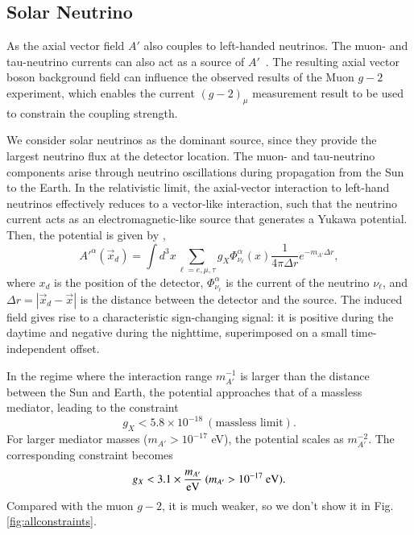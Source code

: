 \documentclass[onecolumn, aps, nofootinbib, prd, preprint, floats, floatfix, amsmath, amssymb, superscriptaddress, preprintnumbers]{revtex4-1}
\begin{document}
\subsection{Solar Neutrino}
As the axial vector field $A'$ also couples to left-handed neutrinos. The muon- and tau-neutrino currents can also act as a source of $A'$~\cite{Fang:2025fvo}. The resulting axial vector boson background field can influence the observed results of the Muon $g-2$ experiment, which enables the current $(g-2)_\mu$ measurement result to be used to constrain the coupling strength. 

We consider solar neutrinos as the dominant source, since they provide the largest neutrino flux at the detector location. The muon- and tau-neutrino components arise through neutrino oscillations during propagation from the Sun to the Earth.
In the relativistic limit, the axial-vector interaction to left-hand neutrinos effectively reduces to a vector-like interaction, such that the neutrino current acts as an electromagnetic-like source that generates a Yukawa potential.
Then, the potential is given by \cite{Fang:2025fvo},
\begin{equation}
A'^{\alpha} (\vec{x}_d)= \int d^3 x \sum_{\ell = e, \mu, \tau} g_X { \Phi_{\nu_\ell}^{\alpha}(x) }\frac{1}{4 \pi \Delta r}  e^{-m_{A'} \Delta r},
\label{eq:axial-vector-potential}
\end{equation}
where $x_d$ is the position of the detector, $\Phi_{\nu_\ell}^{\alpha}$ is the current of the neutrino $\nu_\ell$, and $\Delta r = |\vec{x}_d - \vec{x}|$ is the distance between the detector and the source. The induced field gives rise to a characteristic sign-changing signal: it is positive during the daytime and negative during the nighttime, superimposed on a small time-independent offset.

In the regime where the interaction range $m^{-1}_{A'}$ is larger than the distance between the Sun and Earth, the potential approaches that of a massless mediator, leading to the constraint~\cite{Fang:2025fvo}
\begin{equation}
g_X < 5.8 \times 10^{-18}\  (\text{massless limit}). 
\end{equation}
For larger mediator masses ($m_{A'} > 10^{-17}$ eV), the potential scales as $m^{-2}_{A'}$. The corresponding constraint becomes~\cite{Fang:2025fvo}
\begin{equation}
g_X < 3.1 \times   \frac{ m_{A'}}{{\rm eV}}\ (m_{A'} > 10^{-17}\ \rm{eV}). 
\end{equation}
Compared with the muon $g-2$, it is much weaker, so we don't show it in Fig. \ref{fig:allconstraints}.
\end{document}
